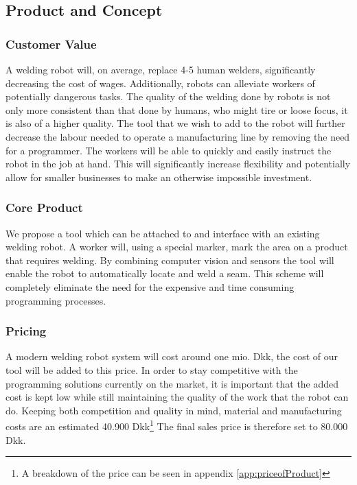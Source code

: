\subsection{Product and Concept}
\subsubsection{Customer Value}
A welding robot will, on average, replace 4-5 human welders, significantly decreasing the cost of wages. Additionally, robots can alleviate workers of potentially dangerous tasks. The quality of the welding done by robots is not only more consistent than that done by humans, who might tire or loose focus, it is also of a higher quality. The tool that we wish to add to the robot will further decrease the labour needed to operate a manufacturing line by removing the need for a programmer. The workers will be able to quickly and easily instruct the robot in the job at hand. This will significantly increase flexibility and potentially allow for smaller businesses to make an otherwise impossible investment.

\subsubsection{Core Product}
We propose a tool which can be attached to and interface with an existing welding robot. 
A worker will, using a special marker, mark the area on a product that requires welding. By combining computer vision and sensors the tool will enable the robot to automatically locate and weld a seam. This scheme will completely eliminate the need for the expensive and time consuming programming processes.

\subsubsection{Pricing}
A modern welding robot system will cost around one mio. Dkk, the cost of our tool will be added to this price. In order to stay competitive with the programming solutions currently on the market, it is important that the added cost is kept low while still maintaining the quality of the work that the robot can do. Keeping both competition and quality in mind, material and manufacturing costs are an estimated 40.900 Dkk\footnote{A breakdown of the price can be seen in appendix \ref{app:priceofProduct}} 
The final sales price is therefore set to 80.000 Dkk.

